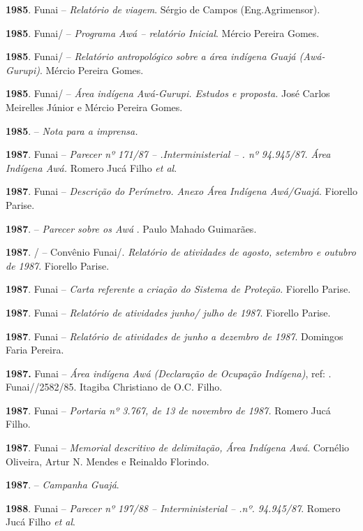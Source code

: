 \textbf{1985}. Funai -- \emph{Relatório de viagem}. Sérgio de Campos
(Eng.Agrimensor).

\textbf{1985}. Funai/ -- \emph{Programa Awá -- relatório Inicial}.
Mércio Pereira Gomes.

\textbf{1985}. Funai/ -- \emph{Relatório antropológico sobre a área
indígena Guajá (Awá-Gurupi)}. Mércio Pereira Gomes.

\textbf{1985}. Funai/  -- \emph{Área indígena Awá-Gurupi. Estudos e
proposta.} José Carlos Meirelles Júnior e Mércio Pereira Gomes.

\textbf{1985}.  -- \emph{Nota para a imprensa.}

\textbf{1987}. Funai -- \emph{Parecer nº 171/87 -- .Interministerial
-- . nº 94.945/87. Área Indígena Awá.} Romero Jucá Filho \emph{et
al}.

\textbf{1987}. Funai -- \emph{Descrição do Perímetro. Anexo Área Indígena
Awá/Guajá}. Fiorello Parise.

\textbf{1987}.  -- \emph{Parecer sobre os Awá} . Paulo Mahado
Guimarães.

\textbf{1987}. /  -- Convênio Funai/. \emph{Relatório de
atividades de agosto, setembro e outubro de 1987}. Fiorello Parise.

\textbf{1987}. Funai -- \emph{Carta referente a criação do Sistema de
Proteção}. Fiorello Parise.

\textbf{1987}. Funai -- \emph{Relatório de atividades junho/ julho de
1987}. Fiorello Parise.

\textbf{1987}. Funai -- \emph{Relatório de atividades de junho a dezembro
de 1987}. Domingos Faria Pereira.

\textbf{1987.} Funai -- \emph{Área indígena Awá (Declaração de Ocupação
Indígena)}, ref: . Funai//2582/85. Itagiba Christiano de O.C.
Filho.

\textbf{1987}. Funai -- \emph{Portaria nº 3.767, de 13 de novembro de
1987.} Romero Jucá Filho.

\textbf{1987}. Funai -- \emph{Memorial descritivo de delimitação, Área
Indígena Awá}. Cornélio Oliveira, Artur N. Mendes e Reinaldo Florindo.

\textbf{1987}.  -- \emph{Campanha Guajá}.

\textbf{1988}. Funai -- \emph{Parecer nº 197/88 --  Interministerial
-- .nº. 94.945/87}. Romero Jucá Filho \emph{et al}.

